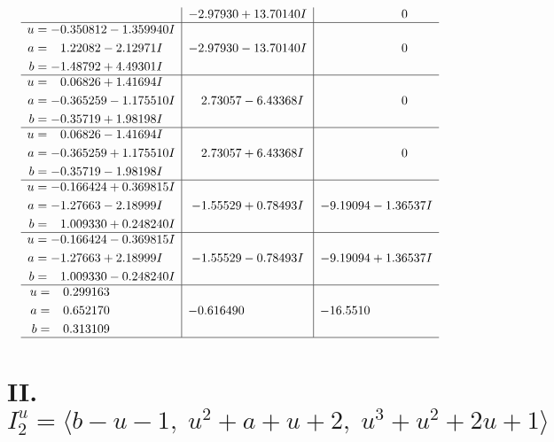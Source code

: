 \documentclass[1p]{elsarticle_modified}
\theoremstyle{definition}
\begin{document}
$$\begin{array}{c|c|c}
 & -2.97930 + 13.70140 I & \phantom{-0.000000 } 0 \\ \hline\begin{aligned}
u &= -0.350812 - 1.359940 I \\
a &= \phantom{-}1.22082 - 2.12971 I \\
b &= -1.48792 + 4.49301 I\end{aligned}
 & -2.97930 - 13.70140 I & \phantom{-0.000000 } 0 \\ \hline\begin{aligned}
u &= \phantom{-}0.06826 + 1.41694 I \\
a &= -0.365259 - 1.175510 I \\
b &= -0.35719 + 1.98198 I\end{aligned}
 & \phantom{-}2.73057 - 6.43368 I & \phantom{-0.000000 } 0 \\ \hline\begin{aligned}
u &= \phantom{-}0.06826 - 1.41694 I \\
a &= -0.365259 + 1.175510 I \\
b &= -0.35719 - 1.98198 I\end{aligned}
 & \phantom{-}2.73057 + 6.43368 I & \phantom{-0.000000 } 0 \\ \hline\begin{aligned}
u &= -0.166424 + 0.369815 I \\
a &= -1.27663 - 2.18999 I \\
b &= \phantom{-}1.009330 + 0.248240 I\end{aligned}
 & -1.55529 + 0.78493 I & -9.19094 - 1.36537 I \\ \hline\begin{aligned}
u &= -0.166424 - 0.369815 I \\
a &= -1.27663 + 2.18999 I \\
b &= \phantom{-}1.009330 - 0.248240 I\end{aligned}
 & -1.55529 - 0.78493 I & -9.19094 + 1.36537 I \\ \hline\begin{aligned}
u &= \phantom{-}0.299163\phantom{ +0.000000I} \\
a &= \phantom{-}0.652170\phantom{ +0.000000I} \\
b &= \phantom{-}0.313109\phantom{ +0.000000I}\end{aligned}
 & -0.616490\phantom{ +0.000000I} & -16.5510\phantom{ +0.000000I}\\
 \hline 
 \end{array}$$\newpage\newpage\renewcommand{\arraystretch}{1}
\centering \section*{II. $I^u_{2}= \langle b- u-1,\;u^2+a+u+2,\;u^3+u^2+2 u+1 \rangle$}
\end{document}
